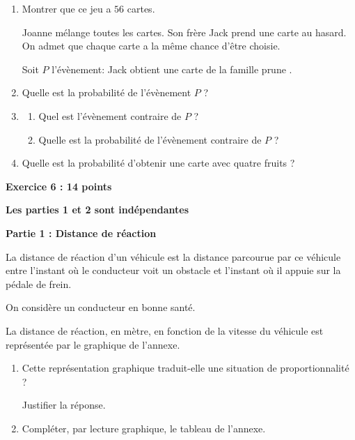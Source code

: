 \documentclass[11pt]{article}
\begin{document}
\medskip

\begin{enumerate}
\item Montrer que ce jeu a $56$ cartes.

Joanne mélange toutes les cartes. Son frère Jack prend une carte au hasard. On admet que chaque carte a la même chance d'être choisie.

Soit $P$ l'évènement: \og Jack obtient une carte de la famille prune \fg.
\item Quelle est la probabilité de l'évènement $P$ ?
\item 
	\begin{enumerate}
		\item Quel est l'évènement contraire de $P$ ?
		\item Quelle est la probabilité de l'évènement contraire de $P$ ?
	\end{enumerate}	
\item Quelle est la probabilité d'obtenir une carte avec quatre fruits ?
\end{enumerate}

\bigskip

\textbf{Exercice 6 : \hfill 14 points}

\medskip

\textbf{Les parties 1 et 2 sont indépendantes}

\bigskip

\textbf{Partie 1 : Distance de réaction}

\medskip

La distance de réaction d'un véhicule est la distance parcourue par ce véhicule entre l'instant où le conducteur voit un obstacle et l'instant où il appuie sur la pédale de frein.

On considère un conducteur en bonne santé.

La distance de réaction, en mètre, en fonction de la vitesse du véhicule est représentée par le graphique de l'annexe.

\medskip

\begin{enumerate}
\item Cette représentation graphique traduit-elle une situation de proportionnalité ?

Justifier la réponse.
\item Compléter, par lecture graphique, le tableau de l'annexe.
\end{enumerate}
\end{document}
